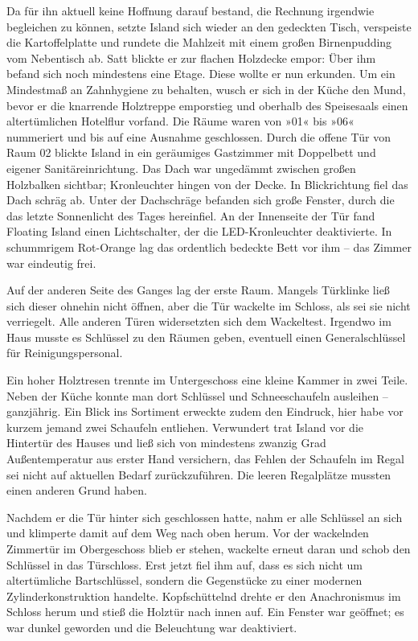 Da für ihn aktuell keine Hoffnung darauf bestand, die Rechnung irgendwie begleichen zu können, setzte Island sich wieder an den gedeckten Tisch, verspeiste die Kartoffelplatte und rundete die Mahlzeit mit einem großen Birnenpudding vom Nebentisch ab. Satt blickte er zur flachen Holzdecke empor: Über ihm befand sich noch mindestens eine Etage. Diese wollte er nun erkunden. Um ein Mindestmaß an Zahnhygiene zu behalten, wusch er sich in der Küche den Mund, bevor er die knarrende Holztreppe emporstieg und oberhalb des Speisesaals einen altertümlichen Hotelflur vorfand. Die Räume waren von »01« bis »06« nummeriert und bis auf eine Ausnahme geschlossen. Durch die offene Tür von Raum 02 blickte Island in ein geräumiges Gastzimmer mit Doppelbett und eigener Sanitäreinrichtung. Das Dach war ungedämmt zwischen großen Holzbalken sichtbar; Kronleuchter hingen von der Decke. In Blickrichtung fiel das Dach schräg ab. Unter der Dachschräge befanden sich große Fenster, durch die das letzte Sonnenlicht des Tages hereinfiel. An der Innenseite der Tür fand Floating Island einen Lichtschalter, der die LED-Kronleuchter deaktivierte. In schummrigem Rot-Orange lag das ordentlich bedeckte Bett vor ihm – das Zimmer war eindeutig frei.

Auf der anderen Seite des Ganges lag der erste Raum. Mangels Türklinke ließ sich dieser ohnehin nicht öffnen, aber die Tür wackelte im Schloss, als sei sie nicht verriegelt. Alle anderen Türen widersetzten sich dem Wackeltest. Irgendwo im Haus musste es Schlüssel zu den Räumen geben, eventuell einen Generalschlüssel für Reinigungspersonal.

Ein hoher Holztresen trennte im Untergeschoss eine kleine Kammer in zwei Teile. Neben der Küche konnte man dort Schlüssel und Schneeschaufeln ausleihen – ganzjährig. Ein Blick ins Sortiment erweckte zudem den Eindruck, hier habe vor kurzem jemand zwei Schaufeln entliehen. Verwundert trat Island vor die Hintertür des Hauses und ließ sich von mindestens zwanzig Grad Außentemperatur aus erster Hand versichern, das Fehlen der Schaufeln im Regal sei nicht auf aktuellen Bedarf zurückzuführen. Die leeren Regalplätze mussten einen anderen Grund haben.

Nachdem er die Tür hinter sich geschlossen hatte, nahm er alle Schlüssel an sich und klimperte damit auf dem Weg nach oben herum. Vor der wackelnden Zimmertür im Obergeschoss blieb er stehen, wackelte erneut daran und schob den Schlüssel in das Türschloss. Erst jetzt fiel ihm auf, dass es sich nicht um altertümliche Bartschlüssel, sondern die Gegenstücke zu einer modernen Zylinderkonstruktion handelte. Kopfschüttelnd drehte er den Anachronismus im Schloss herum und stieß die Holztür nach innen auf. Ein Fenster war geöffnet; es war dunkel geworden und die Beleuchtung war deaktiviert.

